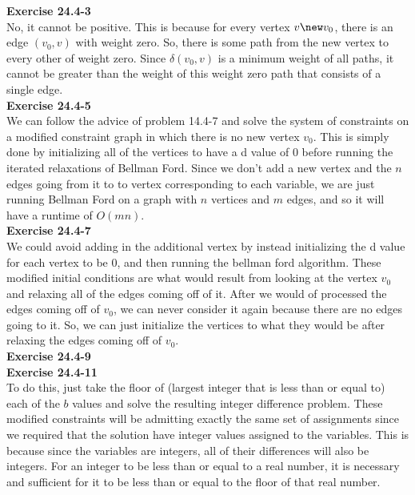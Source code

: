 \documentclass{article}
\begin{document}
\noindent\textbf{Exercise 24.4-3}\\
No, it cannot be positive. This is because for every vertex $v\new v_0$, there is an edge $(v_0,v)$ with weight zero. So, there is some path from the new vertex to every other of weight zero. Since $\delta(v_0,v)$ is a minimum weight of all paths, it cannot be greater than the weight of this weight zero path that consists of a single edge.\\

\noindent\textbf{Exercise 24.4-5}\\
We can follow the advice of problem 14.4-7 and solve the system of constraints on a modified constraint graph in which there is no new vertex $v_0$. This is simply done by initializing all of the vertices to have a d value of 0 before running the iterated relaxations of Bellman Ford. Since we don't add a new vertex and the $n$ edges going from it to to vertex corresponding to each variable, we are just running Bellman Ford on a graph with $n$ vertices and $m$ edges, and so it will have a runtime of $O(mn)$.\\


\noindent\textbf{Exercise 24.4-7}\\
We could avoid adding in the additional vertex by instead initializing the d value for each vertex to be 0, and then running the bellman ford algorithm. These modified initial conditions are what would result from looking at the vertex $v_0$ and relaxing all of the edges coming off of it. After we would of processed the edges coming off of $v_0$, we can never consider it again because there are no edges going to it. So, we can just initialize the vertices to what they would be after relaxing the edges coming off of $v_0$.\\

\noindent\textbf{Exercise 24.4-9}\\

\noindent\textbf{Exercise 24.4-11}\\
To do this, just take the floor of (largest integer that is less than or equal to) each of the $b$ values and solve the resulting integer difference problem. These modified constraints will be admitting exactly the same set of assignments since we required that the solution have integer values assigned to the variables. This is because since the variables are integers, all of their differences will also be integers. For an integer to be less than or equal to a real number, it is necessary and sufficient for it to be less than or equal to the floor of that real number.\\
\end{document}
